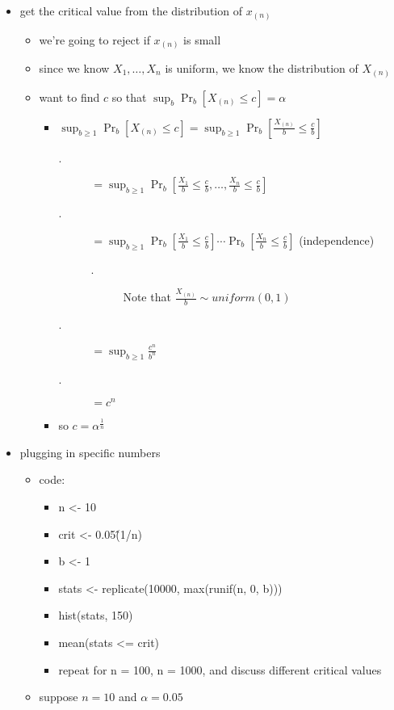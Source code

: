 \begin{itemize}
\begin{itemize}
\item get the critical value from the distribution of $x_{(n)}$
\begin{itemize}
\item we're going to reject if $x_{(n)}$ is small
\item since we know $X_1,\dots,X_n$ is uniform, we know the
          distribution of $X_{(n)}$
\item want to find $c$ so that $\sup_b \Pr_b[X_{(n)} \leq c] = \alpha$
\begin{itemize}
\item $\sup_{b \geq 1} \Pr_b[X_{(n)} \leq c] = \sup_{b\geq 1} \Pr_b[\tfrac{X_{(n)}}{b} \leq \tfrac{c}{b}]$
\begin{description}
\item[.] $=\sup_{b \geq 1} \Pr_b[\tfrac{X_1}{b} \leq \tfrac{c}{b}, \dots, \tfrac{X_n}{b} \leq \tfrac{c}{b}]$
\item[.] $=\sup_{b \geq 1} \Pr_b[\tfrac{X_1}{b} \leq \tfrac{c}{b}] \cdots \Pr_b[\tfrac{X_n}{b} \leq \tfrac{c}{b}]$ (independence)
\begin{description}
\item[.] Note that $\tfrac{X_{(n)}}{b} \sim uniform(0,1)$
\end{description}
\item[.] $= \sup_{b \geq 1} \tfrac{c^n}{b^n}$
\item[.] $= c^n$
\end{description}
\item so $c = \alpha^{\frac1n}$
\end{itemize}
\end{itemize}
\item plugging in specific numbers
\begin{itemize}
\item code:
\begin{itemize}
\item n <- 10
\item crit <- 0.05\^(1/n)
\item b <- 1
\item stats <- replicate(10000, max(runif(n, 0, b)))
\item hist(stats, 150)
\item mean(stats <= crit)
\item repeat for n = 100, n = 1000, and discuss different critical values
\end{itemize}
\item suppose $n = 10$ and $\alpha = 0.05$
\begin{itemize}

\end{itemize}
\end{itemize}
\end{itemize}
\end{itemize}
